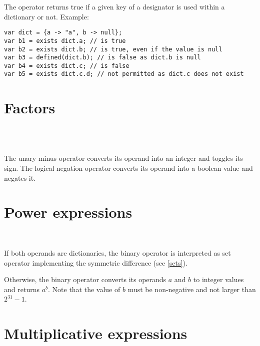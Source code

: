 \noindent
The  operator returns true if a given key of a designator
is used within a dictionary or not. Example:

\begin{lstlisting}
var dict = {a -> "a", b -> null};
var b1 = exists dict.a; // is true
var b2 = exists dict.b; // is true, even if the value is null
var b3 = defined(dict.b); // is false as dict.b is null
var b4 = exists dict.c; // is false
var b5 = exists dict.c.d; // not permitted as dict.c does not exist
\end{lstlisting}

\section{Factors}

\begin{grammar}
      \produces {} \\
      \produces \lextoken{$-$}  \\
      \produces \lextoken{!} 
\end{grammar}

\noindent
The unary minus operator \token{$-$} converts its operand into an integer
and toggles its sign. The logical negation operator \token{!} converts
its operand into a boolean value and negates it.

\section{Power expressions}

\begin{grammar}
      \produces {} \\
      \produces {}
         \lextoken{\caretSY} 
\end{grammar}

\noindent
If both operands are dictionaries, the binary operator \token{\caretSY}
is interpreted as set operator implementing the symmetric difference
(see \ref{sets}).

Otherwise, the binary operator \token{\caretSY} converts its operands
$a$ and $b$ to integer values and returns $a^b$. Note that
the value of $b$ must be non-negative and not larger than $2^{31}-1$.

\section{Multiplicative expressions}

